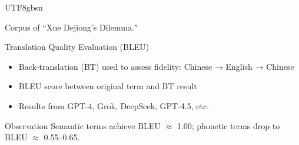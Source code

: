 \documentclass{beamer}
\begin{document}
\begin{CJK*}{UTF8}{gbsn}
\begin{frame}{Corpus of “Xue Dejiong’s Dilemma."}
\end{frame}

\begin{frame}{Translation Quality Evaluation (BLEU)}
\begin{itemize}
    \item Back-translation (BT) used to assess fidelity: Chinese → English → Chinese
    \item BLEU score between original term and BT result
    \item Results from GPT-4, Grok, DeepSeek, GPT-4.5, etc.
\end{itemize}

\vspace{0.4cm}
\begin{block}{Observation}
    Semantic terms achieve BLEU $\approx$ 1.00; phonetic terms drop to BLEU $\approx$ 0.55–0.65.
\end{block}
\end{frame}



\end{CJK*}
\end{document}
